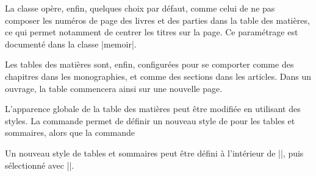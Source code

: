 La classe opère, enfin, quelques choix par défaut, comme celui de ne pas composer les numéros de page des livres et des parties dans la table des matières, ce qui permet notamment de centrer les titres sur la page. Ce paramétrage est documenté dans la classe |memoir|.

\begin{noprint}
\renewcommand*{\cftdotsep}{2}
\end{noprint}

Les tables des matières sont, enfin, configurées pour se comporter comme des chapitres dans les monographies, et comme des sections dans les articles. Dans un ouvrage, la table commencera ainsi sur une nouvelle page.

\begin{noprint}
\if@article\else
	\pretocmd{\tableofcontents}
		{\clearforchapter}
		{}{}
\fi
\end{noprint}



L'apparence globale de la table des matières peut être modifiée en utilisant des styles. La commande  permet de définir un nouveau style de pour les tables et sommaires, alors que la commande 

\begin{noprint}
\newcommand{\maketocstyle}[2]{\expandafter\gdef\csname @tocstyle@#1\endcsname{#2}}
\newcommand{\tocstyle}[1]{\csname @tocstyle@#1\endcsname}
\end{noprint}

Un nouveau style de tables et sommaires peut être défini à l'intérieur de |\maketocstyle|, puis sélectionné avec |\tocstyle|.

\begin{macro}
\end{macro}

